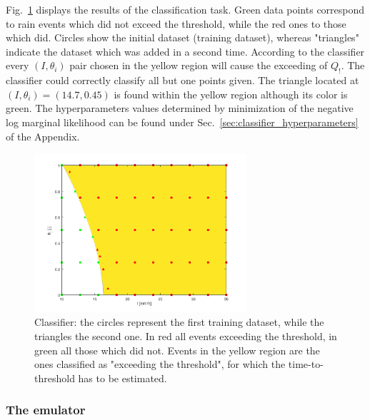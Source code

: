 Fig.~\ref{fig:classifier} displays the results of the classification task.
Green data points correspond to rain events which did not exceed the threshold, while the red ones to those which did.
Circles show the initial dataset (training dataset), whereas "triangles" indicate the dataset which was added in a second time.
According to the classifier every $(I, \theta_i)$ pair chosen in the yellow region will cause the exceeding of $Q_!$.
The classifier could correctly classify all but one points given.
The triangle located at $(I, \theta_i) = (14.7, 0.45)$ is found within the yellow region although its color is green.
The hyperparameters values determined by minimization of the negative log marginal likelihood can be found under Sec.~\ref{sec:classifier_hyperparameters} of the Appendix.


\begin{figure}[h]
  \centering
  \includegraphics[width=0.7\textwidth]{Figures/classifier.png}
  \caption{Classifier: the circles represent the first training dataset, while the triangles the second one. In red all events exceeding the threshold, in green all those which did not. Events in the yellow region are the ones classified as "exceeding the threshold", for which the time-to-threshold has to be estimated.}
  \label{fig:classifier}
\end{figure}


\subsubsection{The emulator}

